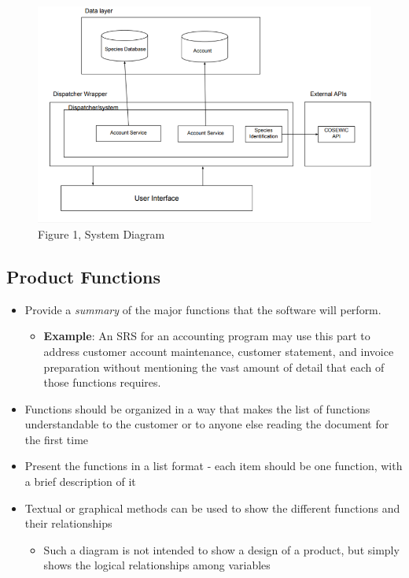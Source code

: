 \documentclass[]{article}
\begin{document}
\begin{figure}[h]
\centering
\includegraphics[width=\textwidth]{figure1.png}
\caption{Figure 1, System Diagram}
\label{fig:system_diagram}
\end{figure}


\subsection{Product Functions}
\label{sub:product_functions}
\begin{itemize}
	\item Provide a \emph{summary} of the major functions that the software will perform.
	\begin{itemize}
		\item \textbf{Example}: An SRS for an accounting program may use this part to address customer account maintenance, customer statement, and invoice preparation without mentioning the vast amount of detail that each of those functions requires.
	\end{itemize}
	\item Functions should be organized in a way that makes the list of functions understandable to the customer or to anyone else reading the document for the first time 
	\item Present the functions in a list format - each item should be one function, with a brief description of it
	\item Textual or graphical methods can be used to show the different functions and their relationships
	\begin{itemize}
		\item Such a diagram is not intended to show a design of a product, but simply shows the logical relationships among variables
	\end{itemize} 
\end{itemize}
\end{document}
